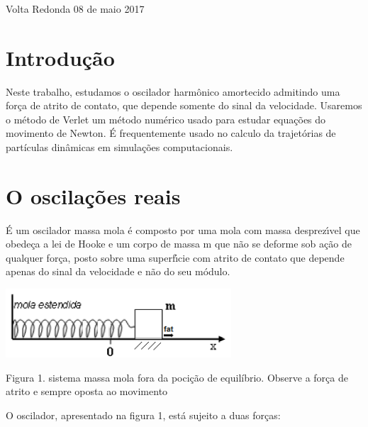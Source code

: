 \documentclass[a4paper]{article} %
\begin{document}
\begin{center}
	\
\end{center}
\begin{center}
	\
\end{center}
\begin{center}
	\
\end{center}
\begin{center}
	Volta Redonda 08 de maio 2017\eject 
	
\end{center}

\setcounter{secnumdepth}{0}
\section{Introdu\c{c}\~{a}o}
\noindent

Neste trabalho, estudamos o oscilador harm\^onico amortecido admitindo uma for\c{c}a de atrito de contato, que depende somente do sinal da velocidade. Usaremos o m\'etodo de Verlet um m\'etodo num\'erico usado para estudar equa\c{c}\~oes do movimento de Newton. \'E frequentemente usado no calculo da trajet\'orias de part\'iculas din\^amicas em simula\c{c}\~oes computacionais.
\noindent \eject 

\section{O oscila\c{c}\~oes reais}
\noindent 
\'E um oscilador massa mola \'e composto por uma mola com massa desprez\'ıvel que obede\c{c}a a lei de Hooke e um corpo de massa m que n\~ao se deforme sob a\c{c}\~ao de qualquer for\c{c}a, posto sobre uma superf\'ıcie com atrito de contato que depende apenas do sinal da velocidade e n\~ao do seu m\'odulo.

\begin{center}
	\includegraphics[width=3.31in,height=1.01in,keepaspectratio = false]{mola.png}
	
	\scriptsize Figura 1. sistema massa mola fora da poci\c{c}\~ao de equil\'ibrio. Observe a for\c{c}a de atrito e sempre oposta ao movimento
	
\end{center}

O oscilador, apresentado na figura 1, est\'a sujeito a duas for\c{c}as:
\end{document}
